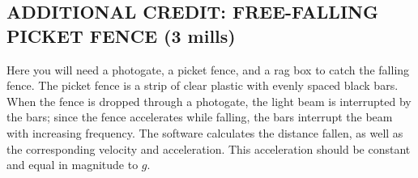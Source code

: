 \subsection*{ADDITIONAL CREDIT: FREE-FALLING PICKET FENCE (3 mills)}

Here you will need a photogate, a picket fence, and a rag box to catch the falling fence.  The picket fence is a strip of clear plastic with evenly spaced black bars.  When the fence is dropped through a photogate, the light beam is interrupted by the bars; since the fence accelerates while falling, the bars interrupt the beam with increasing frequency.  The software calculates the distance fallen, as well as the corresponding velocity and acceleration.  This acceleration should be constant and equal in magnitude to \(g\).

